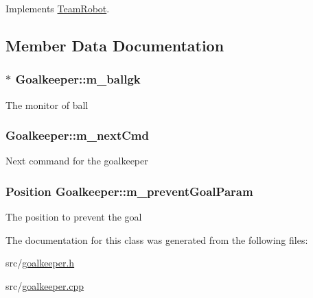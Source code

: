 Implements \hyperlink{classTeamRobot_a65f9a2b7464dfac3f4a0336810cf574f}{TeamRobot}.



\subsection{Member Data Documentation}
\hypertarget{classGoalkeeper_a8fc8e75ffc8d3582d293b0fe42a0c073}{
\subsubsection[{m\_\-ballgk}]{$\ast$ {\bf Goalkeeper::m\_\-ballgk}}}
\label{classGoalkeeper_a8fc8e75ffc8d3582d293b0fe42a0c073}
The monitor of ball \hypertarget{classGoalkeeper_a84e9e9f514d0ace81c95e03ee832aea8}{
\subsubsection[{m\_\-nextCmd}]{ {\bf Goalkeeper::m\_\-nextCmd}}}
\label{classGoalkeeper_a84e9e9f514d0ace81c95e03ee832aea8}
Next command for the goalkeeper \hypertarget{classGoalkeeper_a04b3ca2b51698e36928ccce7569842eb}{
\subsubsection[{m\_\-preventGoalParam}]{\setlength{\rightskip}{0pt plus 5cm}Position {\bf Goalkeeper::m\_\-preventGoalParam}}}
\label{classGoalkeeper_a04b3ca2b51698e36928ccce7569842eb}
The position to prevent the goal 

The documentation for this class was generated from the following files:\begin{DoxyCompactItemize}
\item 
src/\hyperlink{goalkeeper_8h}{goalkeeper.h}\item 
src/\hyperlink{goalkeeper_8cpp}{goalkeeper.cpp}\end{DoxyCompactItemize}
